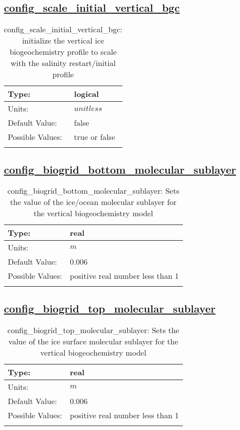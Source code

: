 \subsection[config\_scale\_initial\_vertical\_bgc]{\hyperref[sec:nm_tab_biogeochemistry]{config\_scale\_initial\_vertical\_bgc}}
\label{subsec:nm_sec_config_scale_initial_vertical_bgc}
\begin{center}
\begin{longtable}{| p{2.0in} || p{4.0in} |}
    \hline
    Type: & logical \\
    \hline
    Units: & $unitless$ \\
    \hline
    Default Value: & false \\
    \hline
    Possible Values: & true or false \\
    \hline
    \caption{config\_scale\_initial\_vertical\_bgc: initialize the vertical ice biogeochemistry profile to scale with    the salinity restart/initial profile}
\end{longtable}
\end{center}
\subsection[config\_biogrid\_bottom\_molecular\_sublayer]{\hyperref[sec:nm_tab_biogeochemistry]{config\_biogrid\_bottom\_molecular\_sublayer}}
\label{subsec:nm_sec_config_biogrid_bottom_molecular_sublayer}
\begin{center}
\begin{longtable}{| p{2.0in} || p{4.0in} |}
    \hline
    Type: & real \\
    \hline
    Units: & $m$ \\
    \hline
    Default Value: & 0.006 \\
    \hline
    Possible Values: & positive real number less than 1 \\
    \hline
    \caption{config\_biogrid\_bottom\_molecular\_sublayer: Sets the value of the ice/ocean molecular sublayer for the vertical biogeochemistry model}
\end{longtable}
\end{center}
\subsection[config\_biogrid\_top\_molecular\_sublayer]{\hyperref[sec:nm_tab_biogeochemistry]{config\_biogrid\_top\_molecular\_sublayer}}
\label{subsec:nm_sec_config_biogrid_top_molecular_sublayer}
\begin{center}
\begin{longtable}{| p{2.0in} || p{4.0in} |}
    \hline
    Type: & real \\
    \hline
    Units: & $m$ \\
    \hline
    Default Value: & 0.006 \\
    \hline
    Possible Values: & positive real number less than 1 \\
    \hline
    \caption{config\_biogrid\_top\_molecular\_sublayer: Sets the value of the ice surface molecular sublayer for the vertical biogeochemistry model}
\end{longtable}
\end{center}
